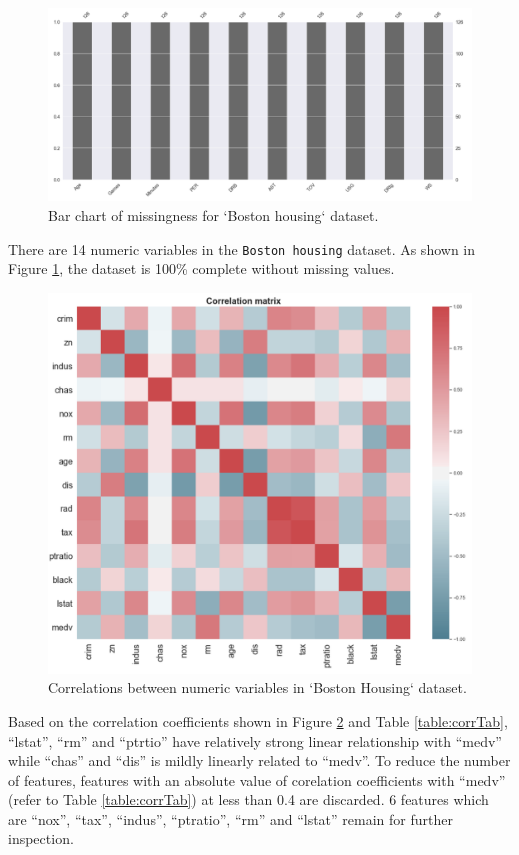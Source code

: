 \documentclass[letterpaper,12pt,twoside,]{pinp}
\begin{document}
\begin{figure}
\includegraphics[width=1\linewidth]{miss_house.png}
\centering
\caption{Bar chart of missingness for `Boston housing` dataset.}
\label{fig:missHouse}
\end{figure}

There are 14 numeric variables in the \texttt{Boston\ housing} dataset.
As shown in Figure \ref{fig:missHouse}, the dataset is 100\% complete
without missing values.

\begin{figure}
\includegraphics[width=1\linewidth]{house_corr.png}
\centering
\caption{Correlations between numeric variables in `Boston Housing` dataset.}
\label{fig:corrHouse}
\end{figure}

Based on the correlation coefficients shown in Figure
\ref{fig:corrHouse} and Table \ref{table:corrTab}, ``lstat'', ``rm'' and
``ptrtio'' have relatively strong linear relationship with ``medv''
while ``chas'' and ``dis'' is mildly linearly related to ``medv''. To
reduce the number of features, features with an absolute value of
corelation coefficients with ``medv'' (refer to Table
\ref{table:corrTab}) at less than 0.4 are discarded. 6 features which
are ``nox'', ``tax'', ``indus'', ``ptratio'', ``rm'' and ``lstat''
remain for further inspection.
\end{document}
